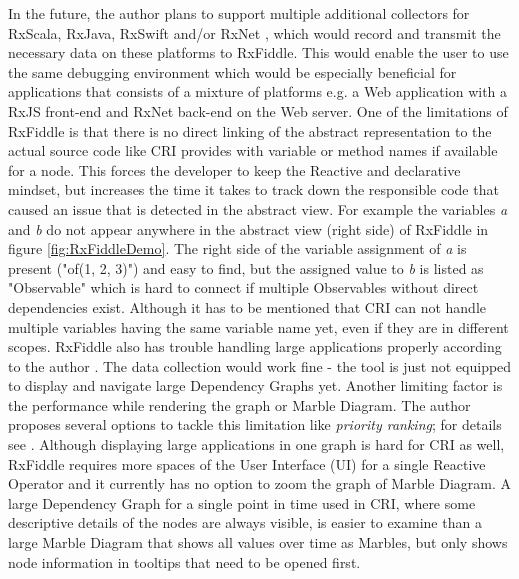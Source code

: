 	In the future, the author plans to support multiple additional collectors for RxScala, RxJava, RxSwift and/or RxNet \cite{RxFiddleTutorials}, which would record and transmit the necessary data on these platforms to RxFiddle. This would enable the user to use the same debugging environment which would be especially beneficial for applications that consists of a mixture of platforms e.g. a Web application with a RxJS front-end and RxNet back-end on the Web server.
	One of the limitations of RxFiddle is that there is no direct linking of the abstract representation to the actual source code like CRI provides with variable or method names if available for a node. This forces the developer to keep the Reactive and declarative mindset, but increases the time it takes to track down the responsible code that caused an issue that is detected in the abstract view. For example the variables \emph{a} and \emph{b} do not appear anywhere in the abstract view (right side) of RxFiddle in figure \ref{fig:RxFiddleDemo}. The right side of the variable assignment of \emph{a} is present ("of(1, 2, 3)") and easy to find, but the assigned value to \emph{b} is listed as "Observable" which is hard to connect if multiple Observables without direct dependencies exist. Although it has to be mentioned that CRI can not handle multiple variables having the same variable name yet, even if they are in different scopes.
	RxFiddle also has trouble handling large applications properly according to the author \cite[Issue 6]{RxFiddleGitHub}. The data collection would work fine - the tool is just not equipped to display and navigate large Dependency Graphs yet. Another limiting factor is the performance while rendering the graph or Marble Diagram. The author proposes several options to tackle this limitation like \emph{priority ranking}; for details see \cite[Issue 6]{RxFiddleGitHub}. Although displaying large applications in one graph is hard for CRI as well, RxFiddle requires more spaces of the User Interface (UI) for a single Reactive Operator and it currently has no option to zoom the graph of Marble Diagram. A large Dependency Graph for a single point in time used in CRI, where some descriptive details of the nodes are always visible, is easier to examine than a large Marble Diagram that shows all values over time as Marbles, but only shows node information in tooltips that need to be opened first.
